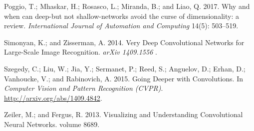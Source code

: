\documentclass[letterpaper]{article} %
\begin{document}
\begin{thebibliography}{25}
Poggio, T.; Mhaskar, H.; Rosasco, L.; Miranda, B.; and Liao, Q. 2017.
\newblock Why and when can deep-but not shallow-networks avoid the curse of
  dimensionality: a review.
\newblock \emph{International Journal of Automation and Computing} 14(5):
  503--519.

Simonyan, K.; and Zisserman, A. 2014.
\newblock Very Deep Convolutional Networks for Large-Scale Image Recognition.
\newblock \emph{arXiv 1409.1556} .

Szegedy, C.; Liu, W.; Jia, Y.; Sermanet, P.; Reed, S.; Anguelov, D.; Erhan, D.;
  Vanhoucke, V.; and Rabinovich, A. 2015.
\newblock Going Deeper with Convolutions.
\newblock In \emph{Computer Vision and Pattern Recognition (CVPR)}.
\newblock \urlprefix\url{http://arxiv.org/abs/1409.4842}.

Zeiler, M.; and Fergus, R. 2013.
\newblock Visualizing and Understanding Convolutional Neural Networks.
\newblock volume 8689.

\end{thebibliography}
\end{document}
